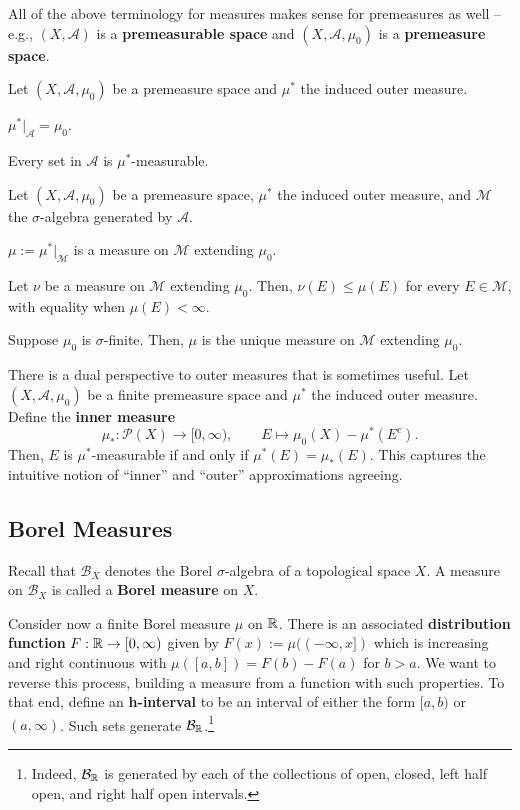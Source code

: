 \documentclass[11pt]{article}
\renewcommand{\A}{\mathcal{A}}
\newcommand{\B}{\mathcal{B}}
\newcommand{\M}{\mathcal{M}}
\renewcommand{\P}{\mathcal{P}}
\begin{document}
All of the above terminology for measures makes sense for premeasures as well -- e.g., $(X,\A)$ is a \textbf{premeasurable space} and $(X,\A,\mu_0)$ is a \textbf{premeasure space}.

\begin{proposition}
Let $(X,\A,\mu_0)$ be a premeasure space and $\mu^*$ the induced outer measure.
\begin{enum}{\alph}
\item $\mu^*|_{\A}=\mu_0$.
\item Every set in $\A$ is $\mu^*$-measurable.
\end{enum}
\end{proposition}

\begin{theorem}
Let $(X,\A,\mu_0)$ be a premeasure space, $\mu^*$ the induced outer measure, and $\M$ the $\sigma$-algebra generated by $\A$.
\begin{enum}{\alph}
\item $\mu:=\mu^*|_{\M}$ is a measure on $\M$ extending $\mu_0$.
\item Let $\nu$ be a measure on $\M$ extending $\mu_0$. Then, $\nu(E)\leq\mu(E)$ for every $E\in\M$, with equality when $\mu(E)<\infty$.
\item Suppose $\mu_0$ is $\sigma$-finite. Then, $\mu$ is the unique measure on $\M$ extending $\mu_0$.
\end{enum}
\end{theorem}

There is a dual perspective to outer measures that is sometimes useful. Let $(X,\A,\mu_0)$ be a finite premeasure space and $\mu^*$ the induced outer measure. Define the \textbf{inner measure} 
$$\mu_*: \P(X)\to[0,\infty),\qquad E\mapsto\mu_0(X)-\mu^*(E^c).$$
Then, $E$ is $\mu^*$-measurable if and only if $\mu^*(E)=\mu_*(E)$. This captures the intuitive notion of ``inner'' and ``outer'' approximations agreeing.

\subsection{Borel Measures}
\begin{definition}
Recall that $\B_X$ denotes the Borel $\sigma$-algebra of a topological space $X$. A measure on $\B_X$ is called a \textbf{Borel measure} on $X$. 
\end{definition}

Consider now a finite Borel measure $\mu$ on $\mathbb{R}$. There is an associated \textbf{distribution function} $F: \mathbb{R}\to[0,\infty)$ given by $F(x):=\mu((-\infty,x])$ which is increasing and right continuous with $\mu([a,b])=F(b)-F(a)$ for $b>a$. We want to reverse this process, building a measure from a function with such properties. To that end, define an \textbf{h-interval} to be an interval of either the form $[a,b)$ or $(a,\infty)$. Such sets generate $\B_{\R}$.\footnote{Indeed, $\B_{\R}$ is generated by each of the collections of open, closed, left half open, and right half open intervals.}
\end{document}
